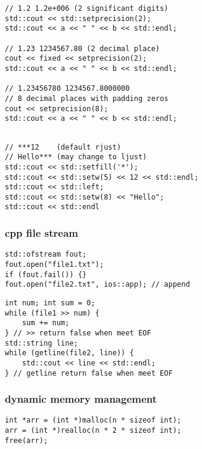 \documentclass[10pt]{article}
\begin{document}
\begin{multicols*}{2}
\begin{tcolorbox}[halign=left]
\begin{verbatim}
// 1.2 1.2e+006 (2 significant digits)
std::cout << std::setprecision(2);
std::cout << a << " " << b << std::endl; 

// 1.23 1234567.80 (2 decimal place)
cout << fixed << setprecision(2);
std::cout << a << " " << b << std::endl;

// 1.23456780 1234567.8000000
// 8 decimal places with padding zeros
cout << setprecision(8);
std::cout << a << " " << b << std::endl;
        \end{verbatim}
    \end{tcolorbox}

    \begin{tcolorbox}[halign=left]
        \begin{verbatim}

// ***12    (default rjust)
// Hello*** (may change to ljust)
std::cout << std::setfill('*');
std::cout << std::setw(5) << 12 << std::endl;
std::cout << std::left;
std::cout << std::setw(8) << "Hello";
std::cout << std::endl
        \end{verbatim}
    \end{tcolorbox}

    \subsubsection*{cpp file stream}
    \begin{tcolorbox}[halign=left]
        \begin{verbatim}
std::ofstream fout;
fout.open("file1.txt");
if (fout.fail()) {}
fout.open("file2.txt", ios::app); // append
        \end{verbatim}
    \end{tcolorbox}

    \begin{tcolorbox}[halign=left]
        \begin{verbatim}
int num; int sum = 0;
while (file1 >> num) {
    sum += num;
} // >> return false when meet EOF
std::string line;
while (getline(file2, line)) {
    std::cout << line << std::endl;
} // getline return false when meet EOF
        \end{verbatim}
    \end{tcolorbox}

    \subsubsection*{dynamic memory management}
    \begin{tcolorbox}[halign=left]
        \begin{verbatim}
int *arr = (int *)malloc(n * sizeof int);
arr = (int *)realloc(n * 2 * sizeof int);
free(arr);


\end{verbatim}
\end{tcolorbox}
\end{multicols*}
\end{document}
